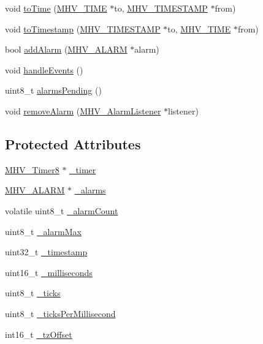 \begin{DoxyCompactItemize}
\item 
void \hyperlink{class_m_h_v___r_t_c_af8e273e8cc911c8f355299416e7a7db2}{to\-Time} (\hyperlink{_m_h_v___r_t_c_8h_adace8912943ac21c837360427880df71}{\-M\-H\-V\-\_\-\-T\-I\-M\-E} $\ast$to, \hyperlink{_m_h_v___r_t_c_8h_a1e30d3a92b1b868286bd0d619245d8a6}{\-M\-H\-V\-\_\-\-T\-I\-M\-E\-S\-T\-A\-M\-P} $\ast$from)
\item 
void \hyperlink{class_m_h_v___r_t_c_aaaf020893b6a5bd81f08371cd804a68b}{to\-Timestamp} (\hyperlink{_m_h_v___r_t_c_8h_a1e30d3a92b1b868286bd0d619245d8a6}{\-M\-H\-V\-\_\-\-T\-I\-M\-E\-S\-T\-A\-M\-P} $\ast$to, \hyperlink{_m_h_v___r_t_c_8h_adace8912943ac21c837360427880df71}{\-M\-H\-V\-\_\-\-T\-I\-M\-E} $\ast$from)
\item 
bool \hyperlink{class_m_h_v___r_t_c_a2d58b554a2ff0eb2cf9f7fccc29e5738}{add\-Alarm} (\hyperlink{_m_h_v___r_t_c_8h_af13307658f41fba330ffae04dd5cbce6}{\-M\-H\-V\-\_\-\-A\-L\-A\-R\-M} $\ast$alarm)
\item 
void \hyperlink{class_m_h_v___r_t_c_abebdf394ea6ed2c48f80cc02d4371a90}{handle\-Events} ()
\item 
uint8\-\_\-t \hyperlink{class_m_h_v___r_t_c_a78c9916568b91c43ba000a8fa851e3e5}{alarms\-Pending} ()
\item 
void \hyperlink{class_m_h_v___r_t_c_ad567f1efa0e4e108699d0895debc40dd}{remove\-Alarm} (\hyperlink{class_m_h_v___alarm_listener}{\-M\-H\-V\-\_\-\-Alarm\-Listener} $\ast$listener)
\end{DoxyCompactItemize}
\subsection*{\-Protected \-Attributes}
\begin{DoxyCompactItemize}
\item 
\hyperlink{class_m_h_v___timer8}{\-M\-H\-V\-\_\-\-Timer8} $\ast$ \hyperlink{class_m_h_v___r_t_c_a394402df903b8eb7e51c415c30cb7057}{\-\_\-timer}
\item 
\hyperlink{_m_h_v___r_t_c_8h_af13307658f41fba330ffae04dd5cbce6}{\-M\-H\-V\-\_\-\-A\-L\-A\-R\-M} $\ast$ \hyperlink{class_m_h_v___r_t_c_afaaed6deea21b52f8bde5f8ebc0abf70}{\-\_\-alarms}
\item 
volatile uint8\-\_\-t \hyperlink{class_m_h_v___r_t_c_a953a79952c9fa5fde5d1dacbc03d3b46}{\-\_\-alarm\-Count}
\item 
uint8\-\_\-t \hyperlink{class_m_h_v___r_t_c_aed7d37466a99362b78dd9ccf1390d35c}{\-\_\-alarm\-Max}
\item 
uint32\-\_\-t \hyperlink{class_m_h_v___r_t_c_a6ac0d6f1b8985cd6113249693da50104}{\-\_\-timestamp}
\item 
uint16\-\_\-t \hyperlink{class_m_h_v___r_t_c_acd3e486b5e5ee1d8cf9d961c0fdbde57}{\-\_\-milliseconds}
\item 
uint8\-\_\-t \hyperlink{class_m_h_v___r_t_c_ab29c30f80f7234394299476c73f36baf}{\-\_\-ticks}
\item 
uint8\-\_\-t \hyperlink{class_m_h_v___r_t_c_a48e7d03e90e78881ed8833d6e4f77b36}{\-\_\-ticks\-Per\-Millisecond}
\item 
int16\-\_\-t \hyperlink{class_m_h_v___r_t_c_af9e544307713892ec196261247213490}{\-\_\-tz\-Offset}
\end{DoxyCompactItemize}


